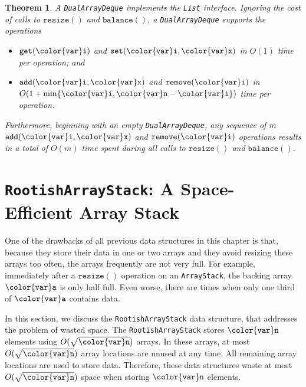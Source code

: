 \documentclass[10pt]{book}
\newcommand{\seclabel}[1]{\label{sec:#1}}
\theoremstyle{plain}
\newtheorem{thm}{Theorem}[chapter]
\newcommand{\thmlabel}[1]{\label{thm:#1}}
\theoremstyle{definition}
\begin{document}
\begin{thm}\thmlabel{dualarraydeque}
  A \texttt{DualArrayDeque} implements the \texttt{List} interface.  Ignoring the
  cost of calls to \ensuremath{\mathtt{resize()}} and \ensuremath{\mathtt{balance()}}, a \texttt{DualArrayDeque}
  supports the operations
  \begin{itemize}
    \item \ensuremath{\mathtt{get({\color{var}i})}} and \ensuremath{\mathtt{set({\color{var}i},{\color{var}x})}} in $O(1)$ time per operation; and
    \item \ensuremath{\mathtt{add({\color{var}i},{\color{var}x})}} and \ensuremath{\mathtt{remove({\color{var}i})}} in $O(1+\min\{\ensuremath{\mathtt{{\color{var}i}}},\ensuremath{\mathtt{{\color{var}n}}}-\ensuremath{\mathtt{{\color{var}i}}}\})$ time
          per operation.
  \end{itemize}
  Furthermore, beginning with an empty \texttt{DualArrayDeque}, any sequence of $m$
  \ensuremath{\mathtt{add({\color{var}i},{\color{var}x})}} and \ensuremath{\mathtt{remove({\color{var}i})}} operations results in a total of $O(m)$
  time spent during all calls to \ensuremath{\mathtt{resize()}} and \ensuremath{\mathtt{balance()}}.
\end{thm}


\section{\texttt{RootishArrayStack}: A Space-Efficient Array Stack}
\seclabel{rootisharraystack}

%
One of the drawbacks of all previous data structures in this chapter is
that, because they store their data in one or two arrays and they avoid
resizing these arrays too often, the arrays frequently are not very full.
For example, immediately after a \ensuremath{\mathtt{resize()}} operation on an \texttt{ArrayStack},
the backing array \ensuremath{\mathtt{{\color{var}a}}} is only half full.  Even worse, there are times
when only one third of \ensuremath{\mathtt{{\color{var}a}}} contains data.

In this section, we discuss the \texttt{RootishArrayStack} data structure,
that addresses the problem of wasted space.  The \texttt{RootishArrayStack}
stores \ensuremath{\mathtt{{\color{var}n}}} elements using $O(\sqrt{\ensuremath{\mathtt{{\color{var}n}}}})$ arrays.  In these arrays, at
most $O(\sqrt{\ensuremath{\mathtt{{\color{var}n}}}})$ array locations are unused at any time.  All
remaining array locations are used to store data.  Therefore, these
data structures waste at most $O(\sqrt{\ensuremath{\mathtt{{\color{var}n}}}})$ space when storing \ensuremath{\mathtt{{\color{var}n}}}
elements.
\end{document}
